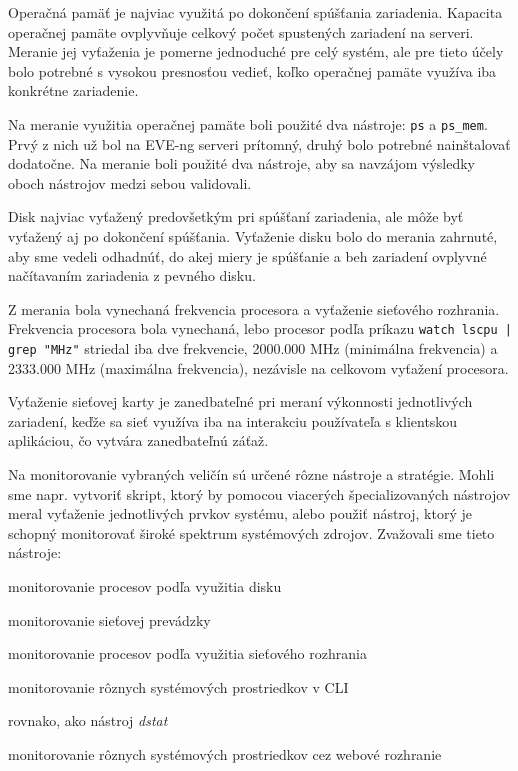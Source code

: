 Operačná pamäť je najviac využitá po dokončení spúšťania zariadenia. Kapacita operačnej pamäte ovplyvňuje celkový počet spustených zariadení na serveri. Meranie jej vyťaženia je pomerne jednoduché pre celý systém, ale pre tieto účely bolo potrebné s vysokou presnosťou vedieť, koľko operačnej pamäte využíva iba konkrétne zariadenie.

Na meranie využitia operačnej pamäte boli použité dva nástroje: \texttt{ps} a \texttt{ps\_mem}. Prvý z nich už bol na EVE-ng serveri prítomný, druhý bolo potrebné nainštalovať dodatočne. Na meranie boli použité dva nástroje, aby sa navzájom výsledky oboch nástrojov medzi sebou validovali.

Disk najviac vyťažený predovšetkým pri spúšťaní zariadenia, ale môže byť vyťažený aj po dokončení spúšťania. Vyťaženie disku bolo do merania zahrnuté, aby sme vedeli odhadnúť, do akej miery je spúšťanie a beh zariadení ovplyvné načítavaním zariadenia z pevného disku.

Z merania bola vynechaná frekvencia procesora a vyťaženie sieťového rozhrania. Frekvencia procesora bola vynechaná, lebo procesor podľa príkazu \texttt{watch lscpu | grep "MHz"} striedal iba dve frekvencie, 2000.000 MHz (minimálna frekvencia) a 2333.000 MHz (maximálna frekvencia), nezávisle na celkovom vyťažení procesora.

Vyťaženie sieťovej karty je zanedbateľné pri meraní výkonnosti jednotlivých zariadení, keďže sa sieť využíva iba na interakciu používateľa s klientskou aplikáciou, čo vytvára zanedbateľnú záťaž.

Na monitorovanie vybraných veličín sú určené rôzne nástroje a stratégie. Mohli sme napr. vytvoriť skript, ktorý by pomocou viacerých špecializovaných nástrojov meral vyťaženie jednotlivých prvkov systému, alebo použiť nástroj, ktorý je schopný monitorovať široké spektrum systémových zdrojov. Zvažovali sme tieto nástroje:

\begin{description}[noitemsep]
    \item [iotop] monitorovanie procesov podľa využitia disku
    \item [nmap] monitorovanie sieťovej prevádzky
    \item [nethogs] monitorovanie procesov podľa využitia sieťového rozhrania
    \item [dstat] monitorovanie rôznych systémových prostriedkov v CLI
    \item [sysstat] rovnako, ako nástroj \emph{dstat}
    \item [netdata] monitorovanie rôznych systémových prostriedkov cez webové rozhranie
\end{description}

